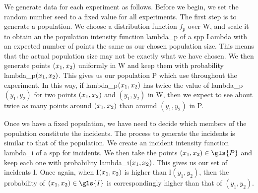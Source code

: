 We generate data for each experiment as follows.
Before we begin, we set the random number seed to a fixed value for all experiments.
The first step is to generate a population.
We choose a distribution function $f_p$ over \gls{W},
and scale it to obtain an the population intensity function \gls{lambda_p} of a \gls{spp} \gls{Lambda} with an expected number of points the same as our chosen population size.
This means that the actual population size may not be exactly what we have chosen.
We then generate points $(x_1, x_2)$ uniformly in \gls{W} and keep them with probability \gls{lambda_p}$(x_1, x_2)$.
This gives us our population \gls{P} which use throughout the experiment.
In this way,
if \gls{lambda_p}$(x_1, x_2)$ has twice the value of \gls{lambda_p}$(y_1, y_2)$ for two points $(x_1, x_2)$ and $(y_1, y_2)$ in \gls{W},
then we expect to see about twice as many points around $(x_1, x_2)$ than around $(y_1, y_2)$ in \gls{P}.

Once we have a fixed population, we have need to decide which members of the population constitute the incidents.
The process to generate the incidents is similar to that of the population.
We create an incident intensity function \gls{lambda_i} of a \gls{spp} for incidents.
We then take the points $\xvec \in \gls{P}$ and keep each one with probability \gls{lambda_i}$(x_1, x_2)$.
This gives us our set of incidents \gls{I}.
Once again, when \gls{I}$(x_1, x_2)$ is higher than \gls{I}$(y_1, y_2)$,
then the probability of $\xvec \in \gls{I}$ is correspondingly higher than that of $(y_1, y_2)$.

